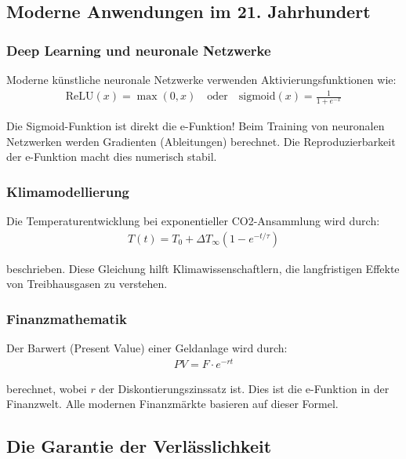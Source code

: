\documentclass[a4paper,12pt,twoside]{report}
\theoremstyle{definition}
\begin{document}
\subsection{Moderne Anwendungen im 21. Jahrhundert}

\subsubsection*{Deep Learning und neuronale Netzwerke}

Moderne künstliche neuronale Netzwerke verwenden Aktivierungsfunktionen wie:
\begin{align}
	\text{ReLU}(x) = \max(0, x) \quad \text{oder} \quad \text{sigmoid}(x) = \frac{1}{1 + e^{-x}}
\end{align}

Die Sigmoid-Funktion ist direkt die e-Funktion! Beim Training von neuronalen Netzwerken werden Gradienten (Ableitungen) berechnet. Die Reproduzierbarkeit der e-Funktion macht dies numerisch stabil.

\subsubsection*{Klimamodellierung}

Die Temperaturentwicklung bei exponentieller CO2-Ansammlung wird durch:
\begin{align}
	T(t) = T_0 + \Delta T_{\infty} (1 - e^{-t/\tau})
\end{align}

beschrieben. Diese Gleichung hilft Klimawissenschaftlern, die langfristigen Effekte von Treibhausgasen zu verstehen.

\subsubsection*{Finanzmathematik}

Der Barwert (Present Value) einer Geldanlage wird durch:
\begin{align}
	PV = F \cdot e^{-rt}
\end{align}

berechnet, wobei $r$ der Diskontierungszinssatz ist. Dies ist die e-Funktion in der Finanzwelt. Alle modernen Finanzmärkte basieren auf dieser Formel.

\subsection{Die Garantie der Verlässlichkeit}
\end{document}

